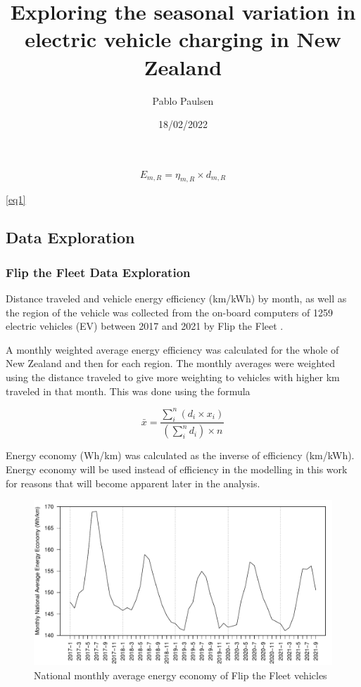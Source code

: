 \documentclass[
]{article}
\title{Exploring the seasonal variation in electric vehicle charging in
New Zealand}
\author{Pablo Paulsen}
\date{18/02/2022}
\begin{document}
\maketitle

\begin{equation}
\label{eq1}
E_{m,R} = \eta_{m,R} \times d_{m,R}
\end{equation}

\ref{eq1}

\hypertarget{data-exploration}{%
\subsection{Data Exploration}\label{data-exploration}}

\hypertarget{flip-the-fleet-data-exploration}{%
\subsubsection{Flip the Fleet Data
Exploration}\label{flip-the-fleet-data-exploration}}

Distance traveled and vehicle energy efficiency (km/kWh) by month, as
well as the region of the vehicle was collected from the on-board
computers of 1259 electric vehicles (EV) between 2017 and 2021 by Flip
the Fleet \cite{ftf}.

A monthly weighted average energy efficiency was calculated for the
whole of New Zealand and then for each region. The monthly averages were
weighted using the distance traveled to give more weighting to vehicles
with higher km traveled in that month. This was done using the formula

\[\bar{x} = \frac{\sum_{i}^{n} (d_i\times x_i)}{\left(\sum_{i}^{n} d_i\right)\times n}\]

Energy economy (Wh/km) was calculated as the inverse of efficiency
(km/kWh). Energy economy will be used instead of efficiency in the
modelling in this work for reasons that will become apparent later in
the analysis.

\begin{figure}
\centering
\includegraphics{final_report_files/figure-latex/consum_plot-1.pdf}
\caption{National monthly average energy economy of Flip the Fleet
vehicles\label{fig:consum_plot}}
\end{figure}
\end{document}
